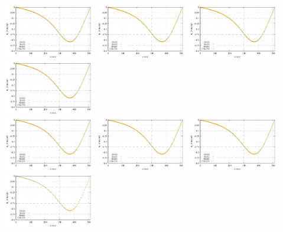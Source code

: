 \begin{center}
\includegraphics[width=4cm]{python_codes/fieldstone_78/results/exp08/vel_profile_topo0_reduced.pdf}
\includegraphics[width=4cm]{python_codes/fieldstone_78/results/exp08/vel_profile_topo1_reduced.pdf}
\includegraphics[width=4cm]{python_codes/fieldstone_78/results/exp08/vel_profile_topo2_reduced.pdf}
\includegraphics[width=4cm]{python_codes/fieldstone_78/results/exp08/vel_profile_topo3_reduced.pdf}\\
\includegraphics[width=4cm]{python_codes/fieldstone_78/results/exp08/vel_profile_topo4_reduced.pdf}
\includegraphics[width=4cm]{python_codes/fieldstone_78/results/exp08/vel_profile_topo5_reduced.pdf}
\includegraphics[width=4cm]{python_codes/fieldstone_78/results/exp08/vel_profile_topo6_reduced.pdf}
\includegraphics[width=4cm]{python_codes/fieldstone_78/results/exp08/vel_profile_topo7_reduced.pdf}
\end{center}
